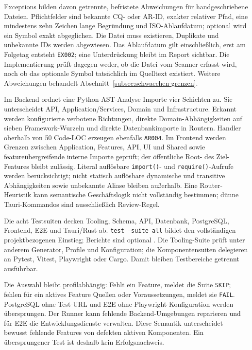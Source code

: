 Exceptions bilden davon getrennte, befristete Abweichungen für handgeschriebene
Dateien. Pflichtfelder sind bekannte CQ- oder AR-ID, exakter relativer Pfad,
eine mindestens zehn Zeichen lange Begründung und ISO-Ablaufdatum; optional
wird ein Symbol exakt abgeglichen. Die Datei muss existieren, Duplikate und
unbekannte IDs werden abgewiesen. Das Ablaufdatum gilt einschließlich, erst am
Folgetag entsteht \texttt{EX002}; eine Unterdrückung bleibt im Report sichtbar.
Die Implementierung prüft dagegen weder, ob die Datei vom Scanner erfasst wird,
noch ob das optionale Symbol tatsächlich im Quelltext existiert. Weitere
Abweichungen behandelt Abschnitt~\ref{subsec:schwaechen-grenzen}.

Im Backend ordnet eine Python-AST-Analyse Importe vier Schichten zu. Sie
unterscheidet API, Application/Services, Domain und Infrastructure. Erkannt
werden konfigurierte verbotene Richtungen, direkte Domain-Abhängigkeiten auf
sieben Framework-Wurzeln und direkte Datenbankimporte in Routern. Handler
oberhalb von 50 Code-LOC erzeugen ebenfalls \texttt{AR004}. Im Frontend werden Grenzen zwischen
Application, Features, API, UI und Shared sowie featureübergreifende interne
Importe geprüft; der öffentliche Root- des Ziel-Features bleibt
zulässig. Literal auflösbare \texttt{import()}- und \texttt{require()}-Aufrufe
werden berücksichtigt; nicht statisch auflösbare dynamische und transitive
Abhängigkeiten sowie unbekannte Aliase bleiben außerhalb. Eine Router-Heuristik
kann semantische Geschäftslogik nicht vollständig bestimmen; dünne
Tauri-Kommandos sind ausschließlich Review-Regel.

Die acht Testsuiten decken Tooling, Schema, API, Datenbank, PostgreSQL,
Frontend, E2E und Tauri/Rust ab. \texttt{test --suite all} bildet den
vollständigen projektbezogenen Einstieg; Berichte sind optional
\parencite{kleiveist2026control,kleiveist2026tooling}.
Die Tooling-Suite prüft unter anderem Generator, Profile und Konfiguration; die
Komponentensuiten delegieren an Pytest, Vitest, Playwright oder Cargo. Damit
bleiben Testbereiche getrennt ausführbar.

Die Auswahl bleibt profilabhängig: Fehlt ein Feature, meldet die Suite
\texttt{SKIP}; fehlen für ein aktives Feature Quellen oder Voraussetzungen,
meldet sie \texttt{FAIL}. PostgreSQL ohne Test-URL und E2E ohne
Playwright-Konfiguration werden übersprungen. Der Runner kann fehlende
Backend-Umgebungen reparieren und für E2E die Entwicklungsdienste verwalten.
Diese Semantik unterscheidet bewusst fehlende Features von defekten aktiven
Komponenten. Ein übersprungener Test ist deshalb kein Erfolgsnachweis.

